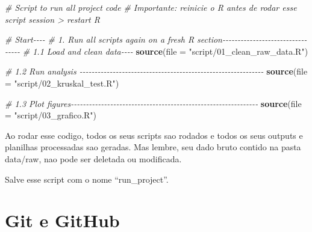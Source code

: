 \documentclass[
]{book}
\newenvironment{Shaded}{\begin{snugshade}}{\end{snugshade}}
\newcommand{\AttributeTok}[1]{\textcolor[rgb]{0.13,0.29,0.53}{#1}}
\newcommand{\CommentTok}[1]{\textcolor[rgb]{0.56,0.35,0.01}{\textit{#1}}}
\newcommand{\FunctionTok}[1]{\textcolor[rgb]{0.13,0.29,0.53}{\textbf{#1}}}
\newcommand{\NormalTok}[1]{#1}
\newcommand{\StringTok}[1]{\textcolor[rgb]{0.31,0.60,0.02}{#1}}
\begin{document}
\begin{Shaded}
\begin{Highlighting}[]
\CommentTok{\# Script to run all project code}
\CommentTok{\# Importante: reinicie o R antes de rodar esse script session \textgreater{} restart R}

\CommentTok{\# Start{-}{-}{-}{-}}
\CommentTok{\# 1. Run all scripts again on a fresh R section{-}{-}{-}{-}{-}{-}{-}{-}{-}{-}{-}{-}{-}{-}{-}{-}{-}{-}{-}{-}{-}{-}{-}{-}{-}{-}{-}{-}{-}{-}{-}{-}{-}}
\CommentTok{\# 1.1 Load and clean data{-}{-}{-}{-}}
\FunctionTok{source}\NormalTok{(}\AttributeTok{file =} \StringTok{"script/01\_clean\_raw\_data.R"}\NormalTok{)}

\CommentTok{\# 1.2 Run analysis {-}{-}{-}{-}{-}{-}{-}{-}{-}{-}{-}{-}{-}{-}{-}{-}{-}{-}{-}{-}{-}{-}{-}{-}{-}{-}{-}{-}{-}{-}{-}{-}{-}{-}{-}{-}{-}{-}{-}{-}{-}{-}{-}{-}{-}{-}{-}{-}{-}{-}{-}{-}{-}{-}{-}{-}{-}{-}{-}{-}{-}}
\FunctionTok{source}\NormalTok{(}\AttributeTok{file =} \StringTok{"script/02\_kruskal\_test.R"}\NormalTok{)}

\CommentTok{\# 1.3 Plot figures{-}{-}{-}{-}{-}{-}{-}{-}{-}{-}{-}{-}{-}{-}{-}{-}{-}{-}{-}{-}{-}{-}{-}{-}{-}{-}{-}{-}{-}{-}{-}{-}{-}{-}{-}{-}{-}{-}{-}{-}{-}{-}{-}{-}{-}{-}{-}{-}{-}{-}{-}{-}{-}{-}{-}{-}{-}{-}{-}{-}{-}{-}}
\FunctionTok{source}\NormalTok{(}\AttributeTok{file =} \StringTok{"script/03\_grafico.R"}\NormalTok{)}
\end{Highlighting}
\end{Shaded}

Ao rodar esse codigo, todos os seus scripts sao rodados e todos os seus outputs e planilhas processadas sao geradas. Mas lembre, seu dado bruto contido na pasta data/raw, nao pode ser deletada ou modificada.

Salve esse script com o nome ``run\_project''.

\hypertarget{git-e-github}{%
\chapter{Git e GitHub}\label{git-e-github}}

  
\end{document}
